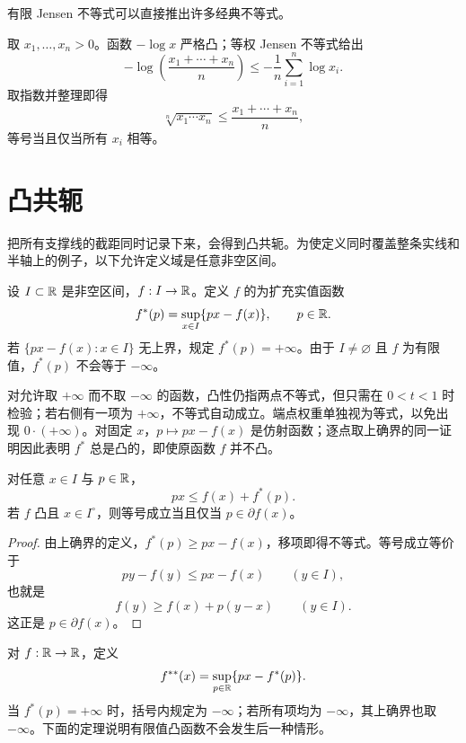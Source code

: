有限 Jensen 不等式可以直接推出许多经典不等式。

\begin{example}[算术平均与几何平均]
取 \(x_1,\dots,x_n>0\)。函数 \(-\log x\) 严格凸；等权 Jensen 不等式给出
\[
 -\log\!\left(\frac{x_1+\cdots+x_n}{n}\right)
 \le -\frac1n\sum_{i=1}^n\log x_i.
\]
取指数并整理即得
\[
 \sqrt[n]{x_1\cdots x_n}\le\frac{x_1+\cdots+x_n}{n},
\]
等号当且仅当所有 \(x_i\) 相等。
\end{example}

\section{凸共轭}

把所有支撑线的截距同时记录下来，会得到凸共轭。为使定义同时覆盖整条实线和半轴上的例子，以下允许定义域是任意非空区间。

\begin{definition}[凸共轭]
设 \(I\subset\mathbb{R}\) 是非空区间，\(f:I\to\mathbb{R}\)。定义 \(f\) 的为扩充实值函数
\[
 f^*(p)=\sup_{x\in I}\{px-f(x)\},\qquad p\in\mathbb{R}.
\]
若 \(\{px-f(x):x\in I\}\) 无上界，规定 \(f^*(p)=+\infty\)。由于 \(I\ne\varnothing\) 且 \(f\) 为有限值，\(f^*(p)\) 不会等于 \(-\infty\)。
\end{definition}

对允许取 \(+\infty\) 而不取 \(-\infty\) 的函数，凸性仍指两点不等式，但只需在 \(0<t<1\) 时检验；若右侧有一项为 \(+\infty\)，不等式自动成立。端点权重单独视为等式，以免出现 \(0\cdot(+\infty)\)。对固定 \(x\)，\(p\mapsto px-f(x)\) 是仿射函数；逐点取上确界的同一证明因此表明 \(f^*\) 总是凸的，即使原函数 \(f\) 并不凸。

\begin{theorem}
\label{thm:fenchel-young}
对任意 \(x\in I\) 与 \(p\in\mathbb{R}\)，
\begin{equation}
 px\le f(x)+f^*(p).
 \label{eq:fenchel-young}
\end{equation}
若 \(f\) 凸且 \(x\in I^\circ\)，则等号成立当且仅当 \(p\in\partial f(x)\)。
\end{theorem}

\begin{proof}
由上确界的定义，\(f^*(p)\ge px-f(x)\)，移项即得不等式。等号成立等价于
\[
 py-f(y)\le px-f(x)\qquad(y\in I),
\]
也就是
\[
 f(y)\ge f(x)+p(y-x)\qquad(y\in I).
\]
这正是 \(p\in\partial f(x)\)。
\end{proof}

\begin{definition}[双共轭]
对 \(f:\mathbb{R}\to\mathbb{R}\)，定义
\[
 f^{**}(x)=\sup_{p\in\mathbb{R}}\{px-f^*(p)\}.
\]
当 \(f^*(p)=+\infty\) 时，括号内规定为 \(-\infty\)；若所有项均为 \(-\infty\)，其上确界也取 \(-\infty\)。下面的定理说明有限值凸函数不会发生后一种情形。
\end{definition}

